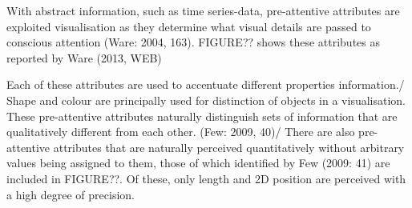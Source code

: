 \documentclass[a4paper,12pt]{article}
\begin{document}
     With abstract information, such as time series-data, pre-attentive attributes are exploited visualisation as they determine what
     visual details are passed to conscious attention (Ware: 2004, 163). FIGURE?? shows these attributes as reported by Ware (2013, WEB)

     Each of these attributes are used to accentuate different properties information./
     Shape and colour are principally used for distinction of objects in a visualisation. These pre-attentive attributes naturally
     distinguish sets of information that are qualitatively different from each other. (Few: 2009, 40)/ %
     There are also pre-attentive attributes that are naturally perceived quantitatively without arbitrary values being assigned to them, those
     of which identified by Few (2009: 41) are included in FIGURE??. Of these, only length and 2D position are perceived with a high degree of precision.
\end{document}
